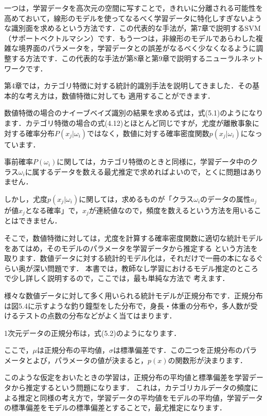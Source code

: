 一つは，学習データを高次元の空間に写すことで，きれいに分離される可能性を高めておいて，線形のモデルを使ってなるべく学習データに特化しすぎないような識別面を求めるという方法です．この代表的な手法が，第7章で説明するSVM（サポートベクトルマシン）です．もう一つは，非線形のモデルであらわした複雑な境界面のパラメータを，学習データとの誤差がなるべく少なくなるように調整する方法です．この代表的な手法が第8章と第9章で説明するニューラルネットワークです．


第4章では，カテゴリ特徴に対する統計的識別手法を説明してきました．その基本的な考え方は，数値特徴に対しても
適用することができます．

数値特徴の場合のナイーブベイズ識別の結果を求める式は，式(5.1)のようになります．カテゴリ特徴の場合の式(4.12)とほとんど同じですが，尤度が離散事象に対する確率分布$P(x_j|\omega_i)$ではなく，数値に対する確率密度関数$p(x_j|\omega_i)$になっています．

事前確率$P(\omega_i)$に関しては，カテゴリ特徴のときと同様に，学習データ中のクラス$\omega_i$に属するデータを数える最尤推定で求めればよいので，とくに問題はありません．

しかし，尤度$p(x_j \vert \omega_i)$に関しては，求めるものが「クラス$\omega_i$のデータの属性$a_j$が値$x_j$となる確率」で，$x_j$が連続値なので，頻度を数えるという方法を用いることはできません．

そこで，数値特徴に対しては，尤度を計算する確率密度関数に適切な統計モデルをあてはめ，そのモデルのパラメータを学習データから推定する
という方法を取ります．数値データに対する統計的モデル化は，それだけで一冊の本になるぐらい奥が深い問題です．
本書では，教師なし学習におけるモデル推定のところで少し詳しく説明するので，ここでは，最も単純な方法で
考えます．

様々な数値データに対して多く用いられる統計モデルが正規分布です．正規分布は図5.4に示すような釣り鐘型をした分布で，身長・体重の分布や，多人数が受けるテストの点数の分布などがよく当てはまります．

1次元データの正規分布は，式(5.2)のようになります．

ここで，$\mu$は正規分布の平均値，$\sigma$は標準偏差です．この二つを正規分布のパラメータとよび，パラメータの値が決まると，$p(x)$の関数形が決まります．

このような仮定をおいたときの学習は，正規分布の平均値と標準偏差を学習データから推定するという問題になります．
これは，カテゴリカルデータの頻度による推定と同様の考え方で，学習データの平均値をモデルの平均値，学習データの標準偏差をモデルの標準偏差とすることで，最尤推定になります．

